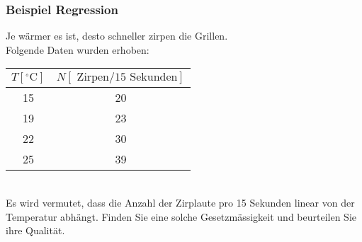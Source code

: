 \subsubsection{Beispiel Regression}
\begin{minipage}{0.49\textwidth}
	Je wärmer es ist, desto schneller zirpen die Grillen.\\
	Folgende Daten wurden erhoben:\\
	\begin{tabular}{c|c}
		$T\left[^{\circ} \mathrm{C}\right]$ & $N[\text { Zirpen/}15 \text { Sekunden}]$\\
		\hline
		15 & 20\\
		19 & 23\\
		22 & 30\\
		25 & 39\\
		\hline	
	\end{tabular}\\[5pt]
	Es wird vermutet, dass die Anzahl der Zirplaute pro 15 Sekunden linear von der Temperatur abhängt.	Finden Sie eine solche Gesetzmässigkeit und beurteilen Sie ihre Qualität.\\[5pt]
	
	
\end{minipage}
\hspace{0.02\textwidth}
